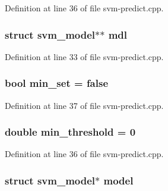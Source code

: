 Definition at line 36 of file svm-\/predict.\-cpp.

\hypertarget{svm-predict_8cpp_a639aa8f86cbf6b9c5d43e0c5082e26ac}{
\subsubsection[{mdl}]{\setlength{\rightskip}{0pt plus 5cm}struct {\bf svm\-\_\-model}$\ast$$\ast$ mdl}}\label{svm-predict_8cpp_a639aa8f86cbf6b9c5d43e0c5082e26ac}


Definition at line 33 of file svm-\/predict.\-cpp.

\hypertarget{svm-predict_8cpp_aa816fb83dd1b415e1339bb8ddd6cdabc}{
\subsubsection[{min\-\_\-set}]{\setlength{\rightskip}{0pt plus 5cm}bool min\-\_\-set = false}}\label{svm-predict_8cpp_aa816fb83dd1b415e1339bb8ddd6cdabc}


Definition at line 37 of file svm-\/predict.\-cpp.

\hypertarget{svm-predict_8cpp_a3670388207cf8d0f4f4c9237a1482057}{
\subsubsection[{min\-\_\-threshold}]{\setlength{\rightskip}{0pt plus 5cm}double min\-\_\-threshold = 0}}\label{svm-predict_8cpp_a3670388207cf8d0f4f4c9237a1482057}


Definition at line 36 of file svm-\/predict.\-cpp.

\hypertarget{svm-predict_8cpp_a50c87b127b14787341e9630f4f5c700a}{
\subsubsection[{model}]{\setlength{\rightskip}{0pt plus 5cm}struct {\bf svm\-\_\-model}$\ast$ model}}\label{svm-predict_8cpp_a50c87b127b14787341e9630f4f5c700a}


